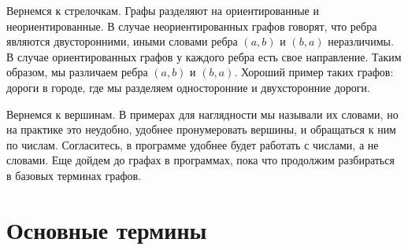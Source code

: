 \documentclass{article}
\begin{document}
Вернемся к стрелочкам. Графы разделяют на ориентированные и неориентированные. В случае неориентированных графов говорят, что ребра являются двусторонними, иными словами ребра $(a,b)$ и $(b,a)$ неразличимы. В случае ориентированных графов у каждого ребра есть свое направление. Таким образом, мы различаем ребра $(a,b)$ и $(b,a)$. Хороший пример таких графов: дороги в городе, где мы разделяем односторонние и двухсторонние дороги. 

Вернемся к вершинам. В примерах для наглядности мы называли их словами, но на практике это неудобно, удобнее пронумеровать вершины, и обращаться к ним по числам. Согласитесь, в программе удобнее будет работать с числами, а не словами. Еще дойдем до графах в программах, пока что продолжим разбираться в базовых терминах графов. 

\section{Основные термины}
\end{document}
